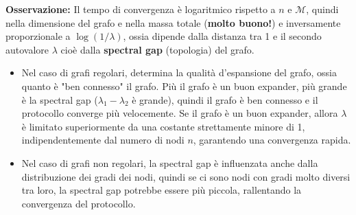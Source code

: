 \textbf{Osservazione:} Il tempo di convergenza è logaritmico rispetto a $n$ e $\mathcal{M}$, quindi nella dimensione del grafo e nella massa totale (\textbf{molto buono!}) e inversamente proporzionale a $\log(1/\lambda)$, ossia dipende dalla distanza tra 1 e il secondo autovalore $\lambda$ cioè dalla \textbf{spectral gap} (topologia) del grafo.
\begin{itemize}
    \item Nel caso di grafi regolari, determina la qualità d'espansione del grafo, ossia quanto è "ben connesso" il grafo. Più il grafo è un buon expander, più grande è la spectral gap ($\lambda_1 - \lambda_2$ è grande), quindi il grafo è ben connesso e il protocollo converge più velocemente. Se il grafo è un buon expander, allora $\lambda$ è limitato superiormente da una costante strettamente minore di 1, indipendentemente dal numero di nodi $n$, garantendo una convergenza rapida.
    \item Nel caso di grafi non regolari, la spectral gap è influenzata anche dalla distribuzione dei gradi dei nodi, quindi se ci sono nodi con gradi molto diversi tra loro, la spectral gap potrebbe essere più piccola, rallentando la convergenza del protocollo.
\end{itemize}

